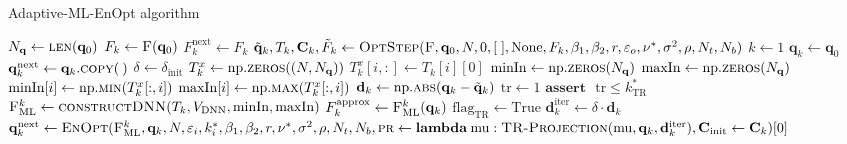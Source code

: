\begin{algorithm}[H]%
\caption{\label{AML-EnOpt}Adaptive-ML-EnOpt algorithm}
\begin{algorithmic}[1]
\State $N_\mathbf{q}\gets\Call{len}{\mathbf{q}_0}$
\State\label{AMLFOMEval1} $F_k\gets \Call{F}{\mathbf{q}_0}$
\State $F^\mathrm{next}_k \gets F_k$
\State\label{FOMOptStepAML1} $\tilde{\mathbf{q}}_k,T_k,\mathbf{C}_k,\tilde{F}_k\gets\Call{OptStep}{\textproc{F}, \mathbf{q}_0, N, 0, [\;], \mathrm{None}, F_k, \beta_1, \beta_2, r, \varepsilon_o, \nu^*, \sigma^2, \rho, N_t, N_b}$
\State $k\gets 1$
\State $\mathbf{q}_k \gets \mathbf{q}_0$
\State $\mathbf{q}^\mathrm{next}_k \gets \mathbf{q}_k.\Call{copy}{\:}$
\State\label{deltaInitAML} $\delta \gets \delta_\mathrm{init}$
\State\label{minMaxInAlg1} $T^x_k \gets \mathrm{np.}\Call{zeros}{(N, N_\mathbf{q})}$
\State $T^x_k[i,:] \gets T_k[i][0]$
\EndFor
\State $\mathrm{minIn} \gets \mathrm{np.}\Call{zeros}{N_\mathbf{q}}$
\State $\mathrm{maxIn} \gets \mathrm{np.}\Call{zeros}{N_\mathbf{q}}$
\State $\mathrm{minIn}[i] \gets \mathrm{np.}\Call{min}{T^x_k[:,i]}$
\State\label{minMaxInAlg2} $\mathrm{maxIn}[i] \gets \mathrm{np.}\Call{max}{T^x_k[:,i]}$
\EndFor
\State\label{d_kDefAML} $\mathbf{d}_k\gets\mathrm{np.}\Call{abs}{\mathbf{q}_k-\tilde{\mathbf{q}}_k}$
\State $\mathrm{tr}\gets1$
\State $\mathbf{assert}\text{ }\mathrm{tr}\leq k^*_\mathrm{TR}$
\State\label{surrogateDefAML} $\textproc{F$_\mathrm{ML}^k$}\gets \Call{constructDNN}{T_k, V_\mathrm{DNN}, \mathrm{minIn}, \mathrm{maxIn}}$
\State $F^\mathrm{approx}_k\gets \Call{F$_\mathrm{ML}^k$}{\mathbf{q}_k}$
\State $\mathrm{flag}_\mathrm{TR}\gets \mathrm{True}$
\State $\mathbf{d}^\mathrm{iter}_k\gets\delta\cdot\mathbf{d}_k$
\State\label{innerIterationCallAlgo} $\mathbf{q}^\mathrm{next}_k\gets\Call{EnOpt}{\textproc{F$_\mathrm{ML}^k$},\mathbf{q}_k,N,\varepsilon_i,k_i^*,\beta_1, \beta_2,r,\nu^*, \sigma^2, \rho, N_t, N_b, \textproc{pr}\gets\mathbf{lambda}\:\mathrm{mu}:\protect\Call{TR-Projection}{\mathrm{mu}, \mathbf{q}_k, \mathbf{d}^\mathrm{iter}_k}, \mathbf{C}_\mathrm{init}\gets\mathbf{C}_k}[0]$

\end{algorithmic}
\end{algorithm}
